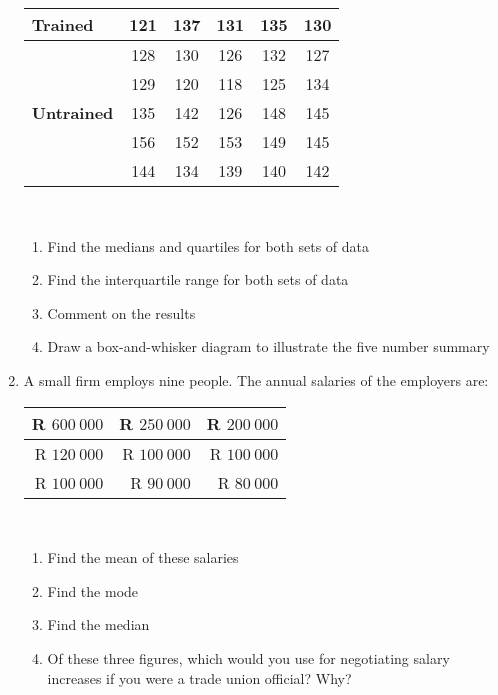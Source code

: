 \begin{eocexercises}{}
\begin{enumerate}[itemsep=6pt, label=\textbf{\arabic*}.]
\begin{center}
\begin{tabular}{|l|c|c|c|c|c|}
        \textbf{Trained} & 121 & 137 & 131 & 135 & 130 \\ \hline
                         & 128 & 130 & 126 & 132 & 127 \\\hline
                         & 129 & 120 & 118 & 125 & 134 \\\hline

        \textbf{Untrained} & 135 & 142 & 126 & 148 & 145 \\\hline
                           & 156 & 152 & 153 & 149 & 145 \\\hline
                           & 144 & 134 & 139 & 140 & 142 \\\hline

      \end{tabular}
    \end{center}
\vspace {8pt}\\
    \begin{enumerate}[noitemsep, label=\textbf{(\alph*)} ]
    \item Find the medians and quartiles for both sets of data
    \item Find the interquartile range for both sets of data
    \item Comment on the results
\item Draw a box-and-whisker diagram to illustrate the five number summary
    \end{enumerate}

  \item A small firm employs nine people. The annual salaries of the employers are:
\\
    \begin{center}
      \begin{tabular}{|r|r|r|} \hline
      
        R $600~ 000$ & R $250~ 000$ & R $200~ 000$ \\\hline
        R $120 ~000 $& R $100~ 000$ & R $100 ~000$ \\\hline
        R $100 ~000$ & R  $90~ 000$ & R  $80 ~000$ \\\hline
   
      \end{tabular}
    \end{center}
\vspace {8pt}\\
    \begin{enumerate}[noitemsep, label=\textbf{(\alph*)} ]
    \item Find the mean of these salaries
    \item Find the mode
    \item Find the median
    \item Of these three figures, which would you use for
      negotiating salary increases if you were a trade union
      official? Why?
    \end{enumerate}


\end{enumerate}
\end{eocexercises}
